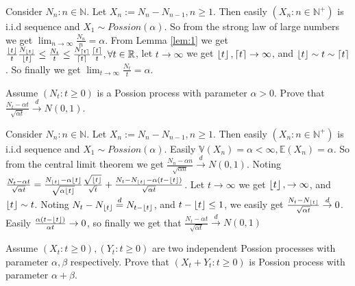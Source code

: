 \documentclass[../main]{subfiles}
\begin{document}
\begin{solution}
  Consider \(N_n:n \in \mathbb{N}\). Let \(X_n:=N_n-N_{n-1},n \geq 1\).
  Then easily \((X_n:n \in \mathbb{N}^+)\) is i.i.d sequence and \(X_1 \sim Possion(\alpha)\).
  So from the strong law of large numbers we get \(\lim_{n \to \infty}\frac{N_n}{n}=\alpha\).
  From Lemma \ref{lem:1} we get \(\frac{\left\lfloor t \right\rfloor}{t} \frac{N_{\left\lfloor t \right\rfloor}}{\left\lfloor t \right\rfloor} \leq \frac{N_t}{t} \leq \frac{N_{\left\lceil t \right\rceil}}{\left\lceil t \right\rceil} \frac{\left\lceil t \right\rceil}{t}, \forall t \in \mathbb{R}\),
  let \(t \to \infty\) we get \(\left\lfloor t \right\rfloor,\left\lceil t \right\rceil \rightarrow \infty\), and \(\left\lfloor t \right\rfloor \sim t \sim \left\lceil t \right\rceil\).
  So finally we get \(\lim_{t \to \infty} \frac{N_t}{t}=\alpha\).
\end{solution}
\begin{problem}\label{pro:3}
  Assume \((N_t:t \geq 0)\) is a Possion process with parameter \(\alpha>0\).
  Prove that \(\frac{N_t-\alpha t}{\sqrt{ \alpha t}} \overset{d}{\to} N(0,1)\).
\end{problem}
\begin{solution}
  Consider \(N_n:n \in \mathbb{N}\). Let \(X_n:=N_n-N_{n-1},n \geq 1\).
  Then easily \((X_n:n \in \mathbb{N}^+)\) is i.i.d sequence and \(X_1 \sim Possion(\alpha)\).
  Easily \(\mathbb{V}(X_n)=\alpha<\infty,\mathbb{E}(X_n)=\alpha\).
  So from the central limit theorem we get \( \frac{N_n-\alpha n}{\sqrt{ \alpha n}} \overset{d}{\to} N(0,1)\).
  Noting \(\frac{N_t - \alpha t}{\sqrt{ \alpha t}}=\frac{N_{\left\lfloor t \right\rfloor}-\alpha \left\lfloor t \right\rfloor}{\sqrt{ \alpha \left\lfloor t \right\rfloor}} \frac{\sqrt{\left\lfloor t \right\rfloor}}{\sqrt{t}} + \frac{N_t-N_{\left\lfloor t \right\rfloor}-\alpha(t-\left\lfloor t \right\rfloor)}{\sqrt{\alpha t}}\).
  Let \(t \to \infty\) we get \(\left\lfloor t \right\rfloor, \rightarrow \infty\), and \(\left\lfloor t \right\rfloor \sim t\).
  Noting \(N_t-N_{\left\lfloor t \right\rfloor}\overset{d}{=}N_{t-\left\lfloor t \right\rfloor}\), and \(t - \left\lfloor t \right\rfloor \leq 1\), we easily get \(\frac{N_t-N_{\left\lfloor t \right\rfloor}}{\sqrt{ \alpha t}} \overset{d}{\rightarrow} 0\).
  Easily \(\frac{\alpha(t-\left\lfloor t \right\rfloor)}{\alpha t} \rightarrow 0\), so finally we get that
  \(\frac{N_t-\alpha t}{\sqrt{ \alpha t}} \overset{d}{\to} N(0,1)\)
\end{solution}
\begin{problem}\label{pro:4}
  Assume \((X_t:t \geq 0),(Y_t:t \geq 0)\) are two independent Possion processes with parameter \(\alpha,\beta\) respectively.
  Prove that \((X_t + Y_t:t \geq 0)\) is Possion process with parameter \(\alpha + \beta\).
\end{problem}
\end{document}
